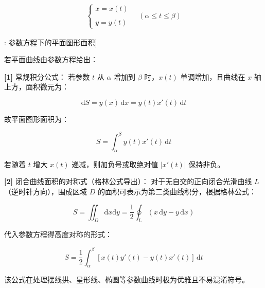 \documentclass[11pt,a4paper,UTF8]{ctexart}
\begin{document}
\begin{align*}
\begin{cases} x = x(t) \\ \\ y = y(t) \end{cases} \quad (\alpha \leqslant t \leqslant \beta)
\end{align*}
\begin{thmbox}[公式[2]: 参数方程下的平面图形面积]

若平面曲线由参数方程给出：


\textbf{[1]} 常规积分公式：
若参数 $t$ 从 $\alpha$ 增加到 $\beta$ 时，$x(t)$ 单调增加，且曲线在 $x$ 轴上方，面积微元为：


\begin{equation*}
\mathrm{d}S = y(x)\,\mathrm{d}x = y(t)x'(t)\,\mathrm{d}t
\end{equation*}


故平面图形面积为：


\begin{equation*}
S = \int_\alpha^\beta y(t)x'(t)\,\mathrm{d}t
\end{equation*}


若随着 $t$ 增大 $x(t)$ 递减，则加负号或取绝对值 $|x'(t)|$ 保持非负。

\textbf{[2]} 闭合曲线面积的对称式（格林公式导出）：
对于无自交的正向闭合光滑曲线 $L$（逆时针方向），围成区域 $D$ 的面积可表示为第二类曲线积分，根据格林公式：


\begin{equation*}
S = \iint_D \mathrm{d}x\mathrm{d}y = \frac{1}{2}\oint_L (x\,\mathrm{d}y - y\,\mathrm{d}x)
\end{equation*}


代入参数方程得高度对称的形式：


\begin{equation*}
S = \frac{1}{2}\int_\alpha^\beta [x(t)y'(t) - y(t)x'(t)]\,\mathrm{d}t
\end{equation*}


该公式在处理摆线拱、星形线、椭圆等参数曲线时极为优雅且不易混淆符号。

\end{thmbox}
\end{document}
